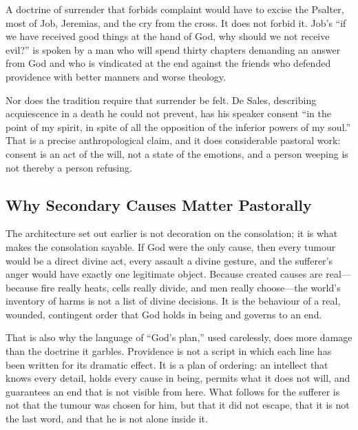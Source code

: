 A doctrine of surrender that forbids complaint would have to excise the Psalter, most of Job, Jeremias, and the cry from the cross. It does not forbid it. Job's ``if we have received good things at the hand of God, why should we not receive evil?'' is spoken by a man who will spend thirty chapters demanding an answer from God and who is vindicated at the end against the friends who defended providence with better manners and worse theology.

Nor does the tradition require that surrender be felt. De Sales, describing acquiescence in a death he could not prevent, has his speaker consent ``in the point of my spirit, in spite of all the opposition of the inferior powers of my soul.'' That is a precise anthropological claim, and it does considerable pastoral work: consent is an act of the will, not a state of the emotions, and a person weeping is not thereby a person refusing.

\subsection{Why Secondary Causes Matter Pastorally}

The architecture set out earlier is not decoration on the consolation; it is what makes the consolation sayable. If God were the only cause, then every tumour would be a direct divine act, every assault a divine gesture, and the sufferer's anger would have exactly one legitimate object. Because created causes are real---because fire really heats, cells really divide, and men really choose---the world's inventory of harms is not a list of divine decisions. It is the behaviour of a real, wounded, contingent order that God holds in being and governs to an end.

That is also why the language of ``God's plan,'' used carelessly, does more damage than the doctrine it garbles. Providence is not a script in which each line has been written for its dramatic effect. It is a plan of ordering: an intellect that knows every detail, holds every cause in being, permits what it does not will, and guarantees an end that is not visible from here. What follows for the sufferer is not that the tumour was chosen for him, but that it did not escape, that it is not the last word, and that he is not alone inside it.
